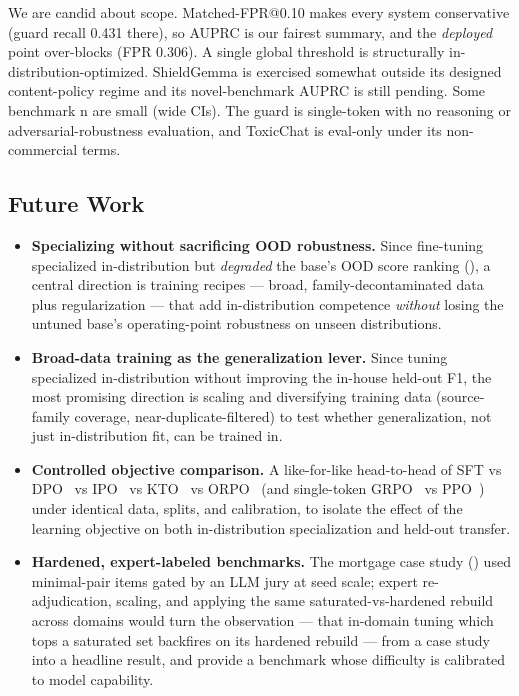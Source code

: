 \documentclass[sigconf,nonacm]{acmart}
\begin{document}
We are candid about scope. Matched-FPR@0.10 makes every system conservative (guard recall 0.431 there), so AUPRC is our fairest summary, and the \emph{deployed} point over-blocks (FPR 0.306). A single global threshold is structurally in-distribution-optimized. ShieldGemma is exercised somewhat outside its designed content-policy regime and its novel-benchmark AUPRC is still pending. Some benchmark n are small (wide CIs). The guard is single-token with no reasoning or adversarial-robustness evaluation, and ToxicChat is eval-only under its non-commercial terms.

\subsection{Future Work}\label{sec:future}

\begin{itemize}
  \item \textbf{Specializing without sacrificing OOD robustness.} Since fine-tuning specialized in-distribution but \emph{degraded} the base's OOD score ranking (), a central direction is training recipes --- broad, family-decontaminated data plus regularization --- that add in-distribution competence \emph{without} losing the untuned base's operating-point robustness on unseen distributions.
  \item \textbf{Broad-data training as the generalization lever.} Since tuning specialized in-distribution without improving the in-house held-out F1, the most promising direction is scaling and diversifying training data (source-family coverage, near-duplicate-filtered) to test whether generalization, not just in-distribution fit, can be trained in.
  \item \textbf{Controlled objective comparison.} A like-for-like head-to-head of SFT vs DPO~\cite{rafailov2023dpo} vs IPO~\cite{azar2023ipo} vs KTO~\cite{ethayarajh2024kto} vs ORPO~\cite{hong2024orpo} (and single-token GRPO~\cite{shao2024deepseekmath} vs PPO~\cite{schulman2017ppo}) under identical data, splits, and calibration, to isolate the effect of the learning objective on both in-distribution specialization and held-out transfer.
  \item \textbf{Hardened, expert-labeled benchmarks.} The mortgage case study () used minimal-pair items gated by an LLM jury at seed scale; expert re-adjudication, scaling, and applying the same saturated-vs-hardened rebuild across domains would turn the observation --- that in-domain tuning which tops a saturated set backfires on its hardened rebuild --- from a case study into a headline result, and provide a benchmark whose difficulty is calibrated to model capability.

\end{itemize}
\end{document}
